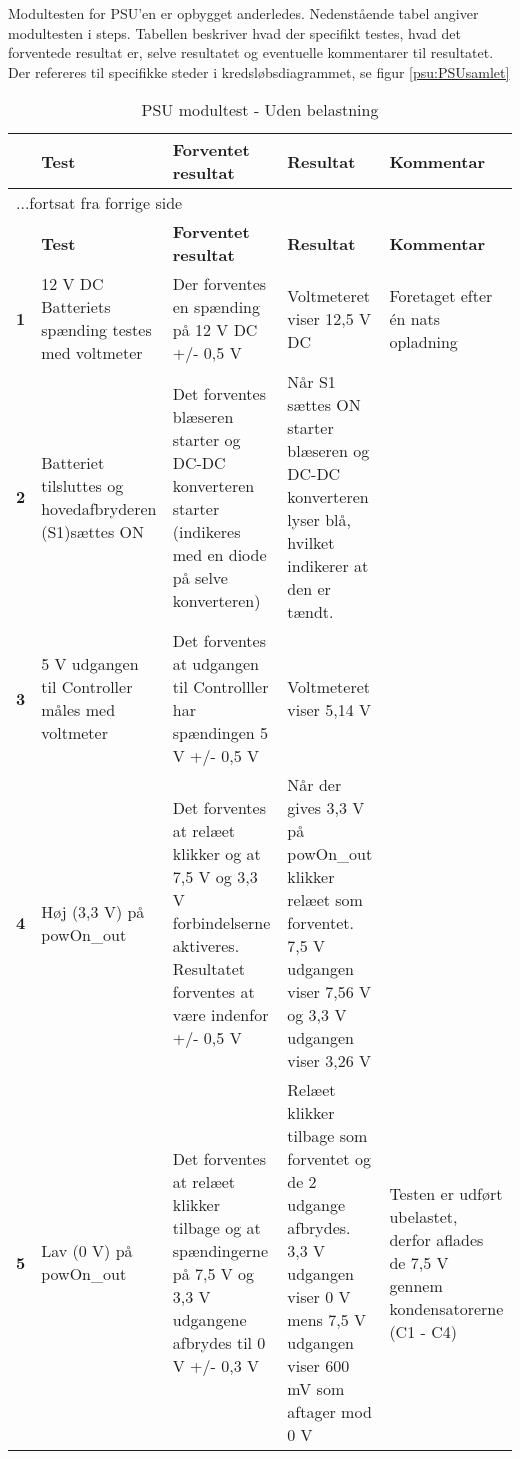 Modultesten for PSU'en er opbygget anderledes. Nedenstående tabel angiver modultesten i steps. Tabellen beskriver hvad der specifikt testes, hvad det forventede resultat er, selve resultatet og eventuelle kommentarer til resultatet. Der refereres til specifikke steder i kredsløbsdiagrammet, se figur \ref{psu:PSUsamlet}

\begin{center}
\label{modultest_psu} 
\begin{longtable}{|p{}|p{}|p{}|p{}|p{}|} %
\caption{PSU modultest - Uden belastning}\\
\hline
\multicolumn{1}{|c|}{} &
\textbf{Test} &
\textbf{Forventet \newline resultat} &
\textbf{Resultat} &
\textbf{Kommentar} \\ \hline 
\endfirsthead

\multicolumn{5}{l}{...fortsat fra forrige side} \\ \hline 
\multicolumn{1}{|c|}{} &
\textbf{Test} &
\textbf{Forventet \newline resultat} &
\textbf{Resultat} &
\textbf{Kommentar} \\ \hline 
\endhead

\textbf{1}	&12 V DC Batteriets spænding testes med voltmeter
			&Der forventes en spænding på 12 V DC +/- 0,5 V
			&Voltmeteret viser 12,5 V DC
			&Foretaget efter én nats opladning  
			\\ \hline 
			
\textbf{2}	&Batteriet tilsluttes og hovedafbryderen (S1)sættes ON
			&Det forventes blæseren starter og DC-DC konverteren starter (indikeres med en diode på selve konverteren)
			&Når S1 sættes ON starter blæseren og DC-DC konverteren lyser blå, hvilket indikerer at den er tændt.
			&  \\ \hline 
			
\textbf{3}	&5 V udgangen til Controller måles med voltmeter
			&Det forventes at udgangen til Controlller har spændingen 5 V +/- 0,5 V
			&Voltmeteret viser 5,14 V
			&  \\ \hline 
			
\textbf{4}	&Høj (3,3 V) på powOn\_out 
			&Det forventes at relæet klikker og at 7,5 V og 3,3 V forbindelserne aktiveres. Resultatet forventes at være indenfor +/- 0,5 V
			&Når der gives 3,3 V på powOn\_out klikker relæet som forventet. 7,5 V udgangen viser 7,56 V og 3,3 V udgangen viser 3,26 V
			&  \\ \hline  
			
\textbf{5}	&Lav (0 V) på powOn\_out 
			&Det forventes at relæet klikker tilbage og at spændingerne på 7,5 V og 3,3 V udgangene afbrydes til 0 V +/- 0,3 V
			&Relæet klikker tilbage som forventet og de 2 udgange afbrydes. 3,3 V udgangen viser 0 V mens 7,5 V udgangen viser 600 mV som aftager mod 0 V
			&Testen er udført ubelastet, derfor aflades de 7,5 V gennem kondensatorerne (C1 - C4)  \\ \hline 					
					
\end{longtable}
\end{center}